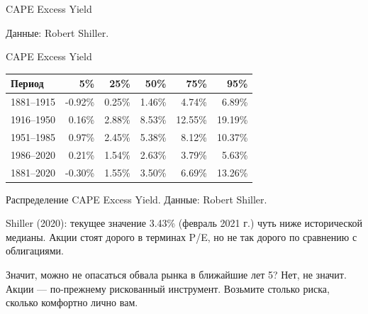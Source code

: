 \documentclass{beamer}
\begin{document}
\begin{frame}{CAPE Excess Yield}
\centering
{}
{\scriptsize Данные: Robert Shiller.}
\end{frame}


\begin{frame}{CAPE Excess Yield}
\centering
\begin{tabular}{l|r|r|r|r|r}
Период     &     5\% &   25\% &   50\% &    75\% &    95\% \\ \hline 
1881--1915 & -0.92\% & 0.25\% & 1.46\% &  4.74\% &  6.89\% \\ 
1916--1950 &  0.16\% & 2.88\% & 8.53\% & 12.55\% & 19.19\% \\
1951--1985 &  0.97\% & 2.45\% & 5.38\% &  8.12\% & 10.37\% \\
1986--2020 &  0.21\% & 1.54\% & 2.63\% &  3.79\% &  5.63\% \\ \hline
1881--2020 & -0.30\% & 1.55\% & 3.50\% &  6.69\% & 13.26\%
\end{tabular}

\centering
{\scriptsize Распределение CAPE Excess Yield. Данные: Robert Shiller.}

\justify
Shiller (2020): текущее значение 3.43\% (февраль 2021 г.) чуть ниже исторической медианы. Акции стоят дорого в терминах P/E, но не так дорого по сравнению с облигациями.

\justify
Значит, можно не опасаться обвала рынка в ближайшие лет 5? Нет, не значит. Акции --- по-прежнему рискованный инструмент. Возьмите столько риска, сколько комфортно лично вам.
\end{frame}
\end{document}
